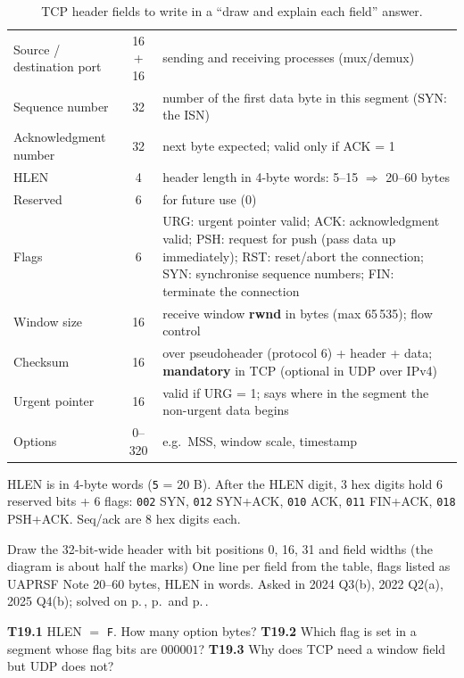 \begin{table}[H]\centering\footnotesize\zebra
\begin{tabularx}{\linewidth}{L{36mm}cY}\toprule
{} &  & \\\midrule
Source / destination port & 16 + 16 & sending and receiving processes (mux/demux)\\
Sequence number & 32 & number of the first data byte in this segment (SYN: the ISN)\\
Acknowledgment number & 32 & next byte expected; valid only if ACK = 1\\
HLEN & 4 & header length in 4-byte words: 5--15 $\Rightarrow$ 20--60 bytes\\
Reserved & 6 & for future use (0)\\
Flags & 6 & URG: urgent pointer valid; ACK: acknowledgment valid; PSH: request for push (pass data up immediately); RST: reset/abort the connection; SYN: synchronise sequence numbers; FIN: terminate the connection\\
Window size & 16 & receive window \textbf{rwnd} in bytes (max 65\,535); flow control\\
Checksum & 16 & over pseudoheader (protocol 6) + header + data; \textbf{mandatory} in TCP (optional in UDP over IPv4)\\
Urgent pointer & 16 & valid if URG = 1; says where in the segment the non-urgent data begins\\
Options & 0--320 & e.g.\ MSS, window scale, timestamp\\\bottomrule
\end{tabularx}
\caption{TCP header fields to write in a ``draw and explain each field'' answer. }
\end{table}

\begin{warningbox}
HLEN is in 4-byte words (\texttt{5} = 20 B). After the HLEN digit, 3 hex digits hold 6 reserved bits + 6 flags: \texttt{002} SYN, \texttt{012} SYN+ACK, \texttt{010} ACK, \texttt{011} FIN+ACK, \texttt{018} PSH+ACK. Seq/ack are 8 hex digits each.
\end{warningbox}

\begin{answerplan}
 Draw the 32-bit-wide header with bit positions 0, 16, 31 and field widths (the diagram is about half the marks) \quad
{} One line per field from the table, flags listed as UAPRSF \quad {} Note 20--60 bytes, HLEN in words.
Asked in 2024 Q3(b), 2022 Q2(a), 2025 Q4(b); solved on p.\,\pageref{q:MS2024-3b}, p.\,\pageref{q:MS2022-2a} and p.\,\pageref{q:MS2025-4b}.
\par{} \textbf{T19.1} HLEN $=$ \texttt{F}. How many option bytes?\quad
\textbf{T19.2} Which flag is set in a segment whose flag bits are $000001$?\quad
\textbf{T19.3} Why does TCP need a window field but UDP does not?
\end{answerplan}

